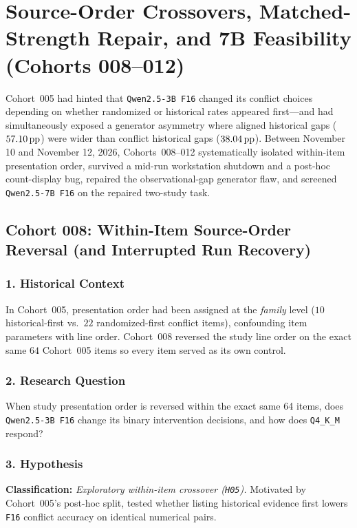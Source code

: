 \chapter{Source-Order Crossovers, Matched-Strength Repair, and 7B Feasibility (Cohorts 008--012)}\label{ch:cohorts_008_012}

Cohort~005 had hinted that \texttt{Qwen2.5-3B F16} changed its conflict choices depending on whether randomized or historical rates appeared first---and had simultaneously exposed a generator asymmetry where aligned historical gaps ($57.10\,\mathrm{pp}$) were wider than conflict historical gaps ($38.04\,\mathrm{pp}$). Between November 10 and November 12, 2026, Cohorts~008--012 systematically isolated within-item presentation order, survived a mid-run workstation shutdown and a post-hoc count-display bug, repaired the observational-gap generator flaw, and screened \texttt{Qwen2.5-7B F16} on the repaired two-study task.

\section{Cohort 008: Within-Item Source-Order Reversal (and Interrupted Run Recovery)}

\subsection*{1. Historical Context}
In Cohort~005, presentation order had been assigned at the \emph{family} level ($10$ historical-first vs.\ $22$ randomized-first conflict items), confounding item parameters with line order. Cohort~008 reversed the study line order on the exact same $64$ Cohort~005 items so every item served as its own control.

\subsection*{2. Research Question}
When study presentation order is reversed within the exact same 64 items, does \texttt{Qwen2.5-3B F16} change its binary intervention decisions, and how does \texttt{Q4\_K\_M} respond?

\subsection*{3. Hypothesis}
\textbf{Classification:} \emph{Exploratory within-item crossover (\texttt{H05}).} Motivated by Cohort~005's post-hoc split, tested whether listing historical evidence first lowers \texttt{F16} conflict accuracy on identical numerical pairs.

